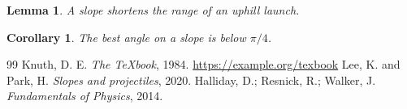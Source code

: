 \documentclass[11pt,a4paper]{article}
\theoremstyle{plain}
\newtheorem{lemma}[theorem]{Lemma}
\newtheorem{corollary}[theorem]{Corollary}
\theoremstyle{definition}
\theoremstyle{remark}
\begin{document}
\begin{lemma}
A slope shortens the range of an uphill launch.

\end{lemma}
\begin{corollary}
The best angle on a slope is below $\pi/4$.

\end{corollary}
\begin{thebibliography}{99}
 Knuth, D. E. \emph{The TeXbook}, 1984. \url{https://example.org/texbook}
 Lee, K. and Park, H. \emph{Slopes and projectiles}, 2020.
 Halliday, D.; Resnick, R.; Walker, J. \emph{Fundamentals of Physics}, 2014.
\end{thebibliography}
\end{document}
